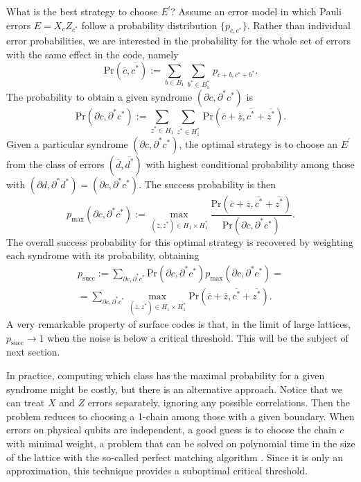 \documentclass{article}
\newcommand{\sset}[1]{ \{#1\} }
\newcommand{\prima}{^\prime}
\newcommand{\prob}[1]{\mathrm{Pr}(#1)}
\newcommand{\dual}[1]{{#1}^{\ast}}
\begin{document}
What is the best strategy to choose $E\prima$? Assume an error model in which Pauli errors $E=X_{c}Z_{\dual c}$ follow a probability distribution $\sset{p_{c,\dual c}}$. Rather than individual error probabilities, we are interested in the probability for the whole set of errors with the same effect in the code, namely
\begin{equation}\label{prob_class}
\prob{\overline c,\overline {\dual c}}:=\sum_{b \in B_1}\sum_{\dual b\in \dual B_1} \,p_{c+b,\dual c+\dual b}.
\end{equation}
The probability to obtain a given syndrome $(\partial c,\dual \partial \dual c)$ is
\begin{equation}\label{prob_synd}
\prob{\partial c,\dual\partial{\dual c}}:=\sum_{\dual z \in H_1}\sum_{\overline {\dual z}\in \dual H_1} \,\prob{\overline c+\overline z,\overline{\dual c}+\overline{\dual z}}.
\end{equation}
Given a particular syndrome $(\partial c, \dual\partial\dual c)$, the optimal strategy is to choose an $E\prima$ from the class of errors $(\overline d,\overline{\dual d})$ with highest conditional probability among those with  $(\partial d, \dual \partial \dual d)=(\partial c, \dual\partial {\dual c})$. The success probability is then
\begin{equation}\label{prob_cond}
p_\mathrm{max}(\partial c,\dual \partial \dual c) :=  \max_{(\overline z,\overline{\dual z})\in H_1\times \dual H_1} \frac{\prob{\overline c+\overline z,\overline{\dual c}+\overline{\dual z}}}{\prob{\partial c,\dual\partial\dual c}}.
\end{equation}
The overall success probability for this optimal strategy is recovered by weighting each syndrome with its probability, obtaining
\begin{multline}\label{prob_succ}
p_\mathrm{succ}:= \sum_{\partial c,\dual \partial \dual c} \prob{\partial c,\dual\partial \dual c} p_\mathrm{max} (\partial c,\dual\partial \dual c)=\\=\sum_{\partial c,\dual \partial \dual c} \max_{(\overline z,\overline{\dual z})\in H_1\times \dual H_1} \prob{\overline c+\overline z,\overline{\dual c}+\overline{\dual z}}.
\end{multline}
A very remarkable property of surface codes is that, in the limit of large lattices, $p_\mathrm{succ}\rightarrow 1$ when the noise is below a critical threshold. This will be the subject of next section.

In practice, computing which class has the maximal probability for a given syndrome might be costly, but there is an alternative approach. Notice that we can treat $X$ and $Z$ errors separately, ignoring any possible correlations. Then the problem reduces to choosing a 1-chain among those with a given boundary. When errors on physical qubits are independent, a good guess is to choose the chain $c$ with minimal weight, a problem that can be solved on polynomial time in the size of the lattice with the so-called perfect matching algorithm \cite{Dennis:2002:4452}. Since it is only an approximation, this technique provides a suboptimal critical threshold.
\end{document}
